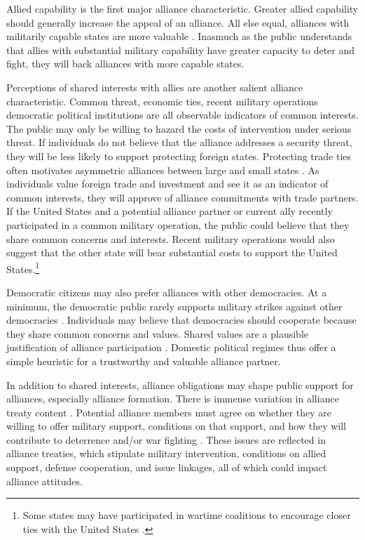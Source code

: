 \documentclass[12pt]{article}
\begin{document}
Allied capability is the first major alliance characteristic.
Greater allied capability should generally increase the appeal of an alliance. 
All else equal, alliances with militarily capable states are more valuable \citep{Johnsonetal2015}. 
Inasmuch as the public understands that allies with substantial military capability have greater capacity to deter and fight, they will back alliances with more capable states. 


Perceptions of shared interests with allies are another salient alliance characteristic. 
Common threat, economic ties, recent military operations democratic political institutions are all observable indicators of common interests. 
The public may only be willing to hazard the costs of intervention under serious threat. 
If individuals do not believe that the alliance addresses a security threat, they will be less likely to support protecting foreign states.
Protecting trade ties often motivates asymmetric alliances between large and small states \citep{Fordham2010}. 
As individuals value foreign trade and investment and see it as an indicator of common interests, they will approve of alliance commitments with trade partners. 
If the United States and a potential alliance partner or current ally recently participated in a common military operation, the public could believe that they share common concerns and interests. 
Recent military operations would also suggest that the other state will bear substantial costs to support the United States.\footnote{Some states may have participated in wartime coalitions to encourage closer ties with the United States \citep{GannonKent2020}.}


Democratic citizens may also prefer alliances with other democracies. 
At a minimum, the democratic public rarely supports military strikes against other democracies \citep{TomzWeeks2013}. 
Individuals may believe that democracies should cooperate because they share common concerns and values. 
Shared values are a plausible justification of alliance participation \citep{Chuetal2021}. 
Domestic political regimes thus offer a simple heuristic for a trustworthy and valuable alliance partner. 


In addition to shared interests, alliance obligations may shape public support for alliances, especially alliance formation. 
There is immense variation in alliance treaty content \citep{Leedsetal2002}.
Potential alliance members must agree on whether they are willing to offer military support, conditions on that support, and how they will contribute to deterrence and/or war fighting \citep{Poast2019a}. 
These issues are reflected in alliance treaties, which stipulate military intervention, conditions on allied support, defense cooperation, and issue linkages, all of which could impact alliance attitudes. 
\end{document}
